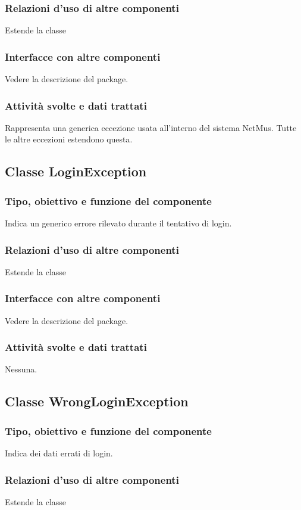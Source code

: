 \subsubsection*{Relazioni d'uso di altre componenti}
Estende la classe 
\subsubsection*{Interfacce con altre componenti}
Vedere la descrizione del package.
\subsubsection*{Attivit\`a svolte e dati trattati}
Rappresenta una generica eccezione usata all'interno del sistema NetMus.
Tutte le altre eccezioni estendono questa.

\subsection{Classe LoginException}
\subsubsection*{Tipo, obiettivo e funzione del componente}
Indica un generico errore rilevato durante il tentativo di login.
\subsubsection*{Relazioni d'uso di altre componenti}
Estende la classe 
\subsubsection*{Interfacce con altre componenti}
Vedere la descrizione del package.
\subsubsection*{Attivit\`a svolte e dati trattati}
Nessuna.

\subsection{Classe WrongLoginException}
\subsubsection*{Tipo, obiettivo e funzione del componente}
Indica dei dati errati di login.
\subsubsection*{Relazioni d'uso di altre componenti}
Estende la classe 
